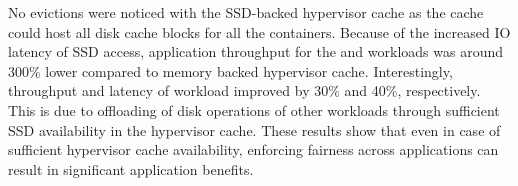 No evictions were noticed with the SSD-backed hypervisor cache %
as the cache could host all disk cache blocks for all the
containers.
%
Because of the increased IO latency of SSD access, application
throughput for the \web{} and \video{} workloads 
was around 300\% lower compared to memory backed hypervisor cache.
%
Interestingly, throughput and latency of \mail{} workload improved
by 30\% and 40\%, respectively.
%
This is due to offloading of disk operations of other workloads 
through sufficient SSD availability in the hypervisor cache.
%
These results show that even in case of sufficient hypervisor cache
availability, enforcing fairness across applications can result in
significant application benefits.
%
